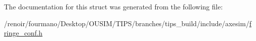 The documentation for this struct was generated from the following file:\begin{DoxyCompactItemize}
\item 
/renoir/fourmano/Desktop/OUSIM/TIPS/branches/tips\_\-build/include/axesim/\hyperlink{fringe__conf_8h}{fringe\_\-conf.h}\end{DoxyCompactItemize}
